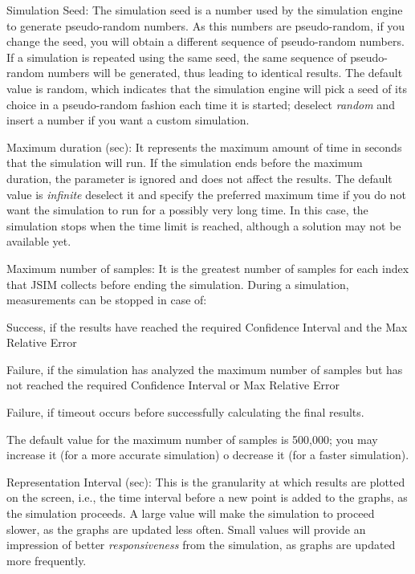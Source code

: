 \begin{description*}
\item [Simulation Seed:] The simulation seed is a
number used by the simulation engine to generate pseudo-random
numbers. As this numbers are pseudo-random, if you change the
seed, you will obtain a different sequence of pseudo-random
numbers. If a simulation is repeated using the same seed, the same
sequence of pseudo-random numbers will be generated, thus leading
to identical results. The default value is random, which indicates
that the simulation engine will pick a seed of its choice in a
pseudo-random fashion each time it is started; deselect
\emph{random} and insert a number if you want a custom simulation.
\item[Maximum duration (sec):] It represents the maximum amount of
time in seconds that the simulation will run. If the simulation
ends before the maximum duration, the parameter is ignored and
does not affect the results. The default value is \emph{infinite}
deselect it and specify the preferred maximum time if you do not
want the simulation to run for a possibly very long time. In this
case, the simulation stops when the time limit is reached,
although a solution may not be available yet. \item [Maximum
number of samples:] It is the greatest number of samples for each
index that JSIM collects before ending the simulation. During a
simulation, measurements can be stopped in case of:
\begin{itemize*}
\item Success, if the results have reached the required Confidence Interval and the Max Relative Error
\item Failure, if the simulation has analyzed the maximum number of samples but has not reached the required Confidence Interval or Max Relative Error
\item Failure, if timeout occurs before successfully calculating the final results.
\end{itemize*}
The default value for the maximum number of samples is 500,000; you may increase it (for a more accurate simulation) o decrease it (for a faster simulation).
\item [Representation Interval (sec):] This is the granularity at which results are plotted on the screen, i.e., the time interval before a new point is added to the graphs, as the simulation proceeds. A large value will make the simulation to proceed slower, as the graphs are updated less often. Small values will provide an impression of better \emph{responsiveness} from the simulation, as graphs are updated more frequently.
\end{description*}
